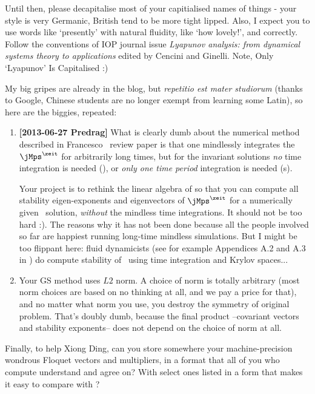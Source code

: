 \begin{description}
Until then, please decapitalise most of your capitialised names of things -
your style is very Germanic, British tend to be more tight lipped. Also, I expect you to use
words like `presently' with natural fluidity, like `how lovely!', and correctly.
Follow the conventions of IOP journal issue {\em Lyapunov analysis: from dynamical systems theory to applications} edited by Cencini and Ginelli. Note, Only `Lyapunov' Is Capitalised :)

My big gripes are already in the blog, but {\em repetitio est mater studiorum}
(thanks to Google, Chinese students are no longer exempt from learning some Latin),
so here are the biggies,  repeated:

\begin{enumerate}
  \item
{\bf[2013-06-27 Predrag]} What is clearly dumb about the numerical
method described in Francesco
    \etal\ review paper is that one mindlessly
    integrates the \jacobianM\  $\jMps^\zeit$
for arbitrarily long times, but for the invariant solutions \emph{no}
time integration is needed (\eqva), or \emph{only one time period}
\period{} integration is needed (\po s).

Your project is to rethink the linear algebra of 
so that you can compute all stability eigen-exponents and eigenvectors
of $\jMps^\zeit$ for a numerically given \eqv\ solution,
\emph{without} the mindless time integrations.
It should not be too hard :). The reasons why it has not been done
because all the people involved so far are happiest running long-time
mindless simulations.
But I might be too flippant here:
fluid dynamicists (see for example
Appendices 
{A.2 and A.3} in ) do compute stability of \eqva\ using
time integration and Krylov spaces...

  \item
Your GS method uses $L2$ norm. A choice of norm is totally arbitrary (most
norm choices are based on no thinking at all, and we pay a price for that),
and no matter what norm you use, you destroy
the symmetry of original problem. That's doubly dumb, because the final
product --covariant vectors and stability exponents-- does not depend on
the choice of norm at all.

\end{enumerate}

Finally, to help Xiong Ding, can you store somewhere your machine-precision
wondrous Floquet vectors and multipliers, in a format that all of you who
compute understand and agree on? With select ones listed in a form
that makes it easy to compare with ?


\end{description}
